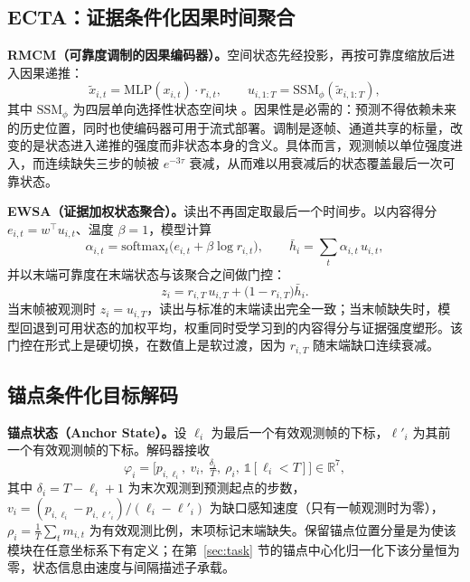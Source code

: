 \subsection{ECTA：证据条件化因果时间聚合}
\label{sec:ecta}

\textbf{RMCM（可靠度调制的因果编码器）。}空间状态先经投影，再按可靠度缩放后进入因果递推：
\begin{equation}
\tilde{x}_{i,t}=\mathrm{MLP}(x_{i,t})\cdot r_{i,t},
\qquad
u_{i,1:T}=\mathrm{SSM}_{\phi}(\tilde{x}_{i,1:T}),
\label{eq:rmcm}
\end{equation}
其中 $\mathrm{SSM}_{\phi}$ 为四层单向选择性状态空间块 \cite{gu2023mamba}。因果性是必需的：预测不得依赖未来的历史位置，同时也使编码器可用于流式部署。调制是逐帧、通道共享的标量，改变的是状态进入递推的强度而非状态本身的含义。具体而言，观测帧以单位强度进入，而连续缺失三步的帧被 $e^{-3\tau}$ 衰减，从而难以用衰减后的状态覆盖最后一次可靠状态。

\textbf{EWSA（证据加权状态聚合）。}读出不再固定取最后一个时间步。以内容得分 $e_{i,t}=w^{\top}u_{i,t}$、温度 $\beta=1$，模型计算
\begin{equation}
\alpha_{i,t}=\mathrm{softmax}_{t}\big(e_{i,t}+\beta\log r_{i,t}\big),\qquad
\bar{h}_{i}=\sum_{t}\alpha_{i,t}\,u_{i,t},
\label{eq:ewsa}
\end{equation}
并以末端可靠度在末端状态与该聚合之间做门控：
\begin{equation}
z_{i}=r_{i,T}\,u_{i,T}+\big(1-r_{i,T}\big)\bar{h}_{i}.
\label{eq:gate}
\end{equation}
当末帧被观测时 $z_{i}=u_{i,T}$，读出与标准的末端读出完全一致；当末帧缺失时，模型回退到可用状态的加权平均，权重同时受学习到的内容得分与证据强度塑形。该门控在形式上是硬切换，在数值上是软过渡，因为 $r_{i,T}$ 随末端缺口连续衰减。

\subsection{锚点条件化目标解码}
\label{sec:decoder}

\textbf{锚点状态（Anchor State）。}设 $\ell_{i}$ 为最后一个有效观测帧的下标，$\ell'_{i}$ 为其前一个有效观测帧的下标。解码器接收
\begin{equation}
\varphi_{i}=\Big[p_{i,\ell_i},\ v_{i},\ \tfrac{\delta_{i}}{T},\ \rho_{i},\ \mathbb{1}[\ell_{i}<T]\Big]\in\mathbb{R}^{7},
\label{eq:anchor}
\end{equation}
其中 $\delta_{i}=T-\ell_{i}+1$ 为末次观测到预测起点的步数，$v_{i}=(p_{i,\ell_i}-p_{i,\ell'_i})/(\ell_i-\ell'_i)$ 为缺口感知速度（只有一帧观测时为零），$\rho_{i}=\frac{1}{T}\sum_{t}m_{i,t}$ 为有效观测比例，末项标记末端缺失。保留锚点位置分量是为使该模块在任意坐标系下有定义；在第~\ref{sec:task} 节的锚点中心化归一化下该分量恒为零，状态信息由速度与间隔描述子承载。

